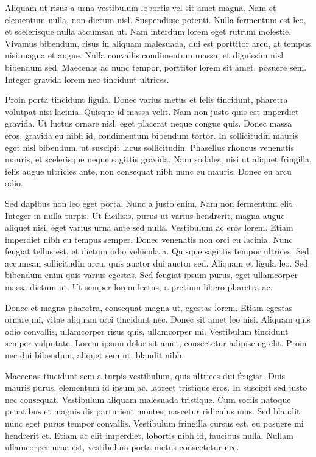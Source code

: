 \documentclass[9pt]{memoir}
\begin{document}
Aliquam ut risus a urna vestibulum lobortis vel sit amet magna. Nam et elementum nulla, non dictum nisl. Suspendisse potenti. Nulla fermentum est leo, et scelerisque nulla accumsan ut. Nam interdum lorem eget rutrum molestie. Vivamus bibendum, risus in aliquam malesuada, dui est porttitor arcu, at tempus nisi magna et augue. Nulla convallis condimentum massa, et dignissim nisl bibendum sed. Maecenas ac nunc tempor, porttitor lorem sit amet, posuere sem. Integer gravida lorem nec tincidunt ultrices.

Proin porta tincidunt ligula. Donec varius metus et felis tincidunt, pharetra volutpat nisi lacinia. Quisque id massa velit. Nam non justo quis est imperdiet gravida. Ut luctus ornare nisl, eget placerat neque congue quis. Donec massa eros, gravida eu nibh id, condimentum bibendum tortor. In sollicitudin mauris eget nisl bibendum, ut suscipit lacus sollicitudin. Phasellus rhoncus venenatis mauris, et scelerisque neque sagittis gravida. Nam sodales, nisi ut aliquet fringilla, felis augue ultricies ante, non consequat nibh nunc eu mauris. Donec eu arcu odio.

Sed dapibus non leo eget porta. Nunc a justo enim. Nam non fermentum elit. Integer in nulla turpis. Ut facilisis, purus ut varius hendrerit, magna augue aliquet nisi, eget varius urna ante sed nulla. Vestibulum ac eros lorem. Etiam imperdiet nibh eu tempus semper. Donec venenatis non orci eu lacinia. Nunc feugiat tellus est, et dictum odio vehicula a. Quisque sagittis tempor ultrices. Sed accumsan sollicitudin arcu, quis auctor dui auctor sed. Aliquam et ligula leo. Sed bibendum enim quis varius egestas. Sed feugiat ipsum purus, eget ullamcorper massa dictum ut. Ut semper lorem lectus, a pretium libero pharetra ac.

Donec et magna pharetra, consequat magna ut, egestas lorem. Etiam egestas ornare mi, vitae aliquam orci tincidunt nec. Donec sit amet leo nisi. Aliquam quis odio convallis, ullamcorper risus quis, ullamcorper mi. Vestibulum tincidunt semper vulputate. Lorem ipsum dolor sit amet, consectetur adipiscing elit. Proin nec dui bibendum, aliquet sem ut, blandit nibh.

Maecenas tincidunt sem a turpis vestibulum, quis ultrices dui feugiat. Duis mauris purus, elementum id ipsum ac, laoreet tristique eros. In suscipit sed justo nec consequat. Vestibulum aliquam malesuada tristique. Cum sociis natoque penatibus et magnis dis parturient montes, nascetur ridiculus mus. Sed blandit nunc eget purus tempor convallis. Vestibulum fringilla cursus est, eu posuere mi hendrerit et. Etiam ac elit imperdiet, lobortis nibh id, faucibus nulla. Nullam ullamcorper urna est, vestibulum porta metus consectetur nec.
\end{document}
